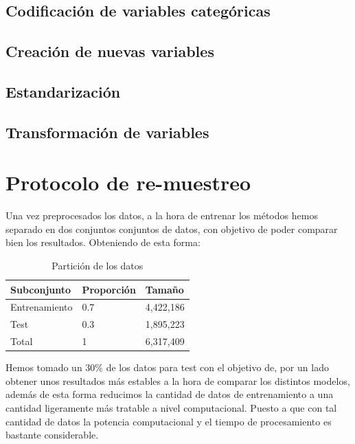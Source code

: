 \documentclass[a4paper]{article}
\begin{document}
\subsection{Codificación de variables categóricas}


\subsection{Creación de nuevas variables}

\subsection{Estandarización}

\subsection{Transformación de variables}

\section{Protocolo de re-muestreo}
Una vez preprocesados los datos, a la hora de entrenar los métodos hemos separado en dos conjuntos conjuntos de datos, 
con objetivo de poder comparar bien los resultados. Obteniendo de esta forma: 

\begin{table}[H]
\centering
\caption{Partición de los datos}
\label{my-label}
\begin{tabular}{|l|l|l|}
\hline
\textbf{Subconjunto}              & \textbf{Proporción}   & \textbf{Tamaño}    \\ \hline
Entrenamiento                     & 0.7                   & 4,422,186   \\ \hline
Test                              & 0.3                   & 1,895,223   \\ \hline
Total                             & 1                     & 6,317,409   \\ \hline
\end{tabular}
\end{table}

Hemos tomado un 30\% de los datos para test con el objetivo de, por un lado obtener unos resultados más estables a la hora de 
comparar los distintos modelos, además de esta forma reducimos la cantidad de datos de entrenamiento a una cantidad ligeramente 
más tratable a nivel computacional. Puesto a que con tal cantidad de datos la potencia computacional y el tiempo de procesamiento es 
bastante considerable. 
\end{document}
